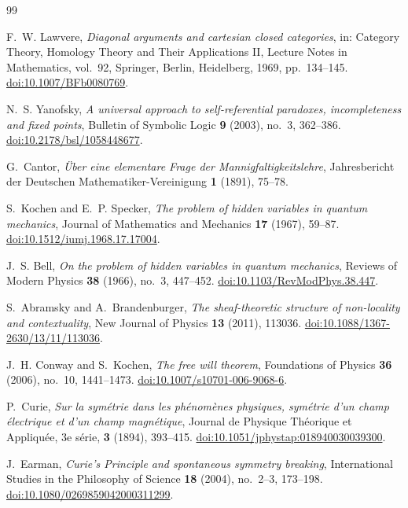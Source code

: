 \documentclass[11pt]{article}
\theoremstyle{definition}
\theoremstyle{remark}
\begin{document}
\begin{thebibliography}{99}

F.~W. Lawvere,
\emph{Diagonal arguments and cartesian closed categories},
in: Category Theory, Homology Theory and Their Applications II,
Lecture Notes in Mathematics, vol.~92, Springer, Berlin, Heidelberg, 1969, pp.~134--145.
\href{https://doi.org/10.1007/BFb0080769}{doi:10.1007/BFb0080769}.

N.~S. Yanofsky,
\emph{A universal approach to self-referential paradoxes, incompleteness and fixed points},
Bulletin of Symbolic Logic \textbf{9} (2003), no.~3, 362--386.
\href{https://doi.org/10.2178/bsl/1058448677}{doi:10.2178/bsl/1058448677}.

G.~Cantor,
\emph{\"Uber eine elementare Frage der Mannigfaltigkeitslehre},
Jahresbericht der Deutschen Mathematiker-Vereinigung \textbf{1} (1891), 75--78.

S.~Kochen and E.~P. Specker,
\emph{The problem of hidden variables in quantum mechanics},
Journal of Mathematics and Mechanics \textbf{17} (1967), 59--87.
\href{https://doi.org/10.1512/iumj.1968.17.17004}{doi:10.1512/iumj.1968.17.17004}.

J.~S. Bell,
\emph{On the problem of hidden variables in quantum mechanics},
Reviews of Modern Physics \textbf{38} (1966), no.~3, 447--452.
\href{https://doi.org/10.1103/RevModPhys.38.447}{doi:10.1103/RevModPhys.38.447}.

S.~Abramsky and A.~Brandenburger,
\emph{The sheaf-theoretic structure of non-locality and contextuality},
New Journal of Physics \textbf{13} (2011), 113036.
\href{https://doi.org/10.1088/1367-2630/13/11/113036}{doi:10.1088/1367-2630/13/11/113036}.

J.~H. Conway and S.~Kochen,
\emph{The free will theorem},
Foundations of Physics \textbf{36} (2006), no.~10, 1441--1473.
\href{https://doi.org/10.1007/s10701-006-9068-6}{doi:10.1007/s10701-006-9068-6}.

P.~Curie,
\emph{Sur la sym\'etrie dans les ph\'enom\`enes physiques, sym\'etrie d'un champ \'electrique et d'un champ magn\'etique},
Journal de Physique Th\'eorique et Appliqu\'ee, 3e s\'erie, \textbf{3} (1894), 393--415.
\href{https://doi.org/10.1051/jphystap:018940030039300}{doi:10.1051/jphystap:018940030039300}.

J.~Earman,
\emph{Curie's Principle and spontaneous symmetry breaking},
International Studies in the Philosophy of Science \textbf{18} (2004), no.~2--3, 173--198.
\href{https://doi.org/10.1080/0269859042000311299}{doi:10.1080/0269859042000311299}.


\end{thebibliography}
\end{document}
